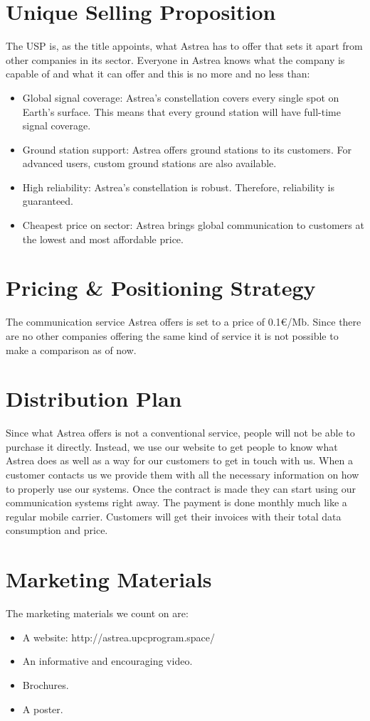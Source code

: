 \section{Unique Selling Proposition}
The USP is, as the title appoints, what Astrea has to offer that sets it apart from other companies in its sector. Everyone in Astrea knows what the company is capable of and what it can offer and this is no more and no less than:
\begin{itemize}
\item Global signal coverage: Astrea's constellation covers every single spot on Earth's surface. This means that every ground station will have full-time signal coverage.
\item Ground station support: Astrea offers ground stations to its customers. For advanced users, custom ground stations are also available.
\item High reliability: Astrea's constellation is robust. Therefore, reliability is guaranteed.
\item Cheapest price on sector: Astrea brings global communication to customers at the lowest and most affordable price.
\end{itemize}
\section{Pricing \& Positioning Strategy}
The communication service Astrea offers is set to a price of 0.1\euro /Mb. Since there are no other companies offering the same kind of service it is not possible to make a comparison as of now. 

\section{Distribution Plan}
Since what Astrea offers is not a conventional service, people will not be able to purchase it directly. Instead, we use our website to get people to know what Astrea does as well as a way for our customers to get in touch with us. When a customer contacts us we provide them with all the necessary information on how to properly use our systems. Once the contract is made they can start using our communication systems right away. The payment is done monthly much like a regular mobile carrier. Customers will get their invoices with their total data consumption and price.

\section{Marketing Materials}
The marketing materials we count on are:
\begin{itemize}
\item A website: http://astrea.upcprogram.space/
\item An informative and encouraging video.
\item Brochures.
\item A poster.
\end{itemize}


